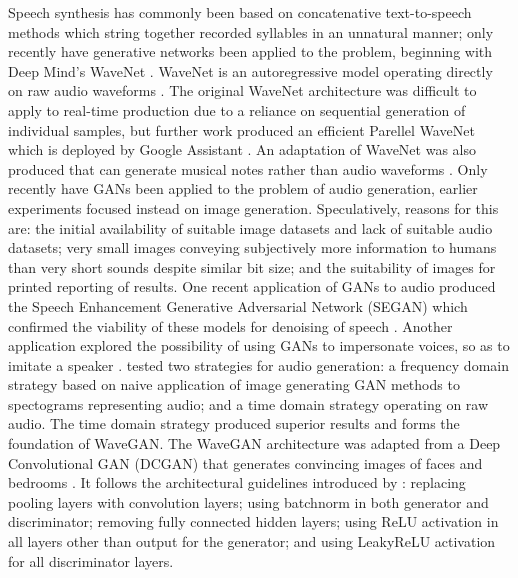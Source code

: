 \documentclass[a4paper, dvipsnames, titlepage]{article}
\begin{document}
Speech synthesis has commonly been based on concatenative text-to-speech methods which string together recorded syllables in an unnatural manner; only recently have generative networks been applied to the problem, beginning with Deep Mind's WaveNet \citep{waveNetUrl}.
WaveNet is an autoregressive model operating directly on raw audio waveforms \citep{DBLP:journals/corr/OordDZSVGKSK16}.
\newline
\newline
The original WaveNet architecture was difficult to apply to real-time production due to a reliance on sequential generation of individual samples, but further work produced an efficient Parellel WaveNet which is deployed by Google Assistant \citep{2017arXiv171110433V}.
An adaptation of WaveNet was also produced that can generate musical notes rather than audio waveforms \citep{2017arXiv170401279E}.
\newline
\newline
Only recently have GANs been applied to the problem of audio generation, earlier experiments focused instead on image generation.
Speculatively, reasons for this are: the initial availability of suitable image datasets and lack of suitable audio datasets; very small images conveying subjectively more information to humans than very short sounds despite similar bit size; and the suitability of images for printed reporting of results.
\newline
\newline
One recent application of GANs to audio produced the Speech Enhancement Generative Adversarial Network (SEGAN) which confirmed the viability of these models for denoising of speech \citep{2017arXiv170309452P}.
Another application explored the possibility of using GANs to impersonate voices, so as to imitate a speaker \citep{2018arXiv180206840G}.
\newline
\newline
\citeauthor{2018arXiv180204208D} tested two strategies for audio generation: a frequency domain strategy based on naive application of image generating GAN methods to spectograms representing audio; and a time domain strategy operating on raw audio.
The time domain strategy produced superior results and forms the foundation of WaveGAN.
\newline
\newline
The WaveGAN architecture was adapted from a Deep Convolutional GAN (DCGAN) that generates convincing images of faces and bedrooms \citep{2015arXiv151106434R}.
It follows the architectural guidelines introduced by \citeauthor{2015arXiv151106434R}: replacing pooling layers with convolution layers; using batchnorm in both generator and discriminator; removing fully connected hidden layers; using ReLU activation in all layers other than output for the generator; and using LeakyReLU activation for all discriminator layers.
\end{document}
